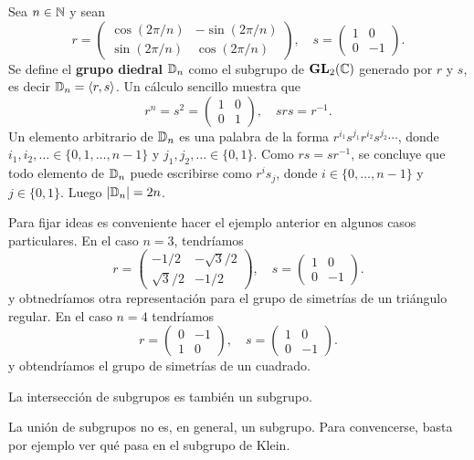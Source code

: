 \begin{example}
Sea $n\in\mathbb{N}$ y sean 
\[
r=\begin{pmatrix}	
\cos(2\pi/n) & -\sin(2\pi/n)\\
\sin(2\pi/n) & \cos(2\pi/n)
\end{pmatrix},
\quad
s=\begin{pmatrix}
	1 & 0\\
	0 & -1
\end{pmatrix}.
\]
Se define el \textbf{grupo diedral} $\mathbb{D}_n$ como
el subgrupo de $\mathbf{GL}_2(\mathbb{C})$ generado por $r$ y $s$, 
es decir $\mathbb{D}_n=\langle r,s\rangle$. Un cálculo sencillo muestra que
\[
r^n=s^2=\begin{pmatrix}
	1&0\\
	0&1
\end{pmatrix},
\quad
srs=r^{-1}.
\] 
Un elemento arbitrario de $\mathbb{D}_n$ es una palabra  
de la forma $r^{i_1}s^{j_1}r^{i_2}s^{j_2}\cdots$, donde $i_1,i_2,\dots\in\{0,1,\dots,n-1\}$ y 
$j_1,j_2,\dots\in\{0,1\}$. Como $rs=sr^{-1}$, se concluye que 
todo elemento de $\mathbb{D}_n$ puede escribirse como $r^is_j$, 
donde $i\in\{0,\dots,n-1\}$ y $j\in\{0,1\}$. Luego  
$|\mathbb{D}_n|=2n$. 
\end{example}

Para fijar ideas es conveniente hacer el ejemplo anterior en algunos casos particulares. 
En el caso $n=3$, tendríamos
\[
r=\begin{pmatrix}	
-1/2 & -\sqrt{3}/2\\
\sqrt{3}/2 & -1/2
\end{pmatrix},
\quad
s=\begin{pmatrix}
	1 & 0\\
	0 & -1
\end{pmatrix}.
\]
y obtnedríamos otra representación para el grupo de simetrías de un triángulo regular. En el caso
$n=4$ tendríamos
\[
r=\begin{pmatrix}	
0 & -1\\
1 & 0
\end{pmatrix},
\quad
s=\begin{pmatrix}
	1 & 0\\
	0 & -1
\end{pmatrix}.
\]
y obtendríamos el grupo de simetrías de un cuadrado. 

\begin{exercise}
	La intersección de subgrupos es también un subgrupo.
\end{exercise}

La unión de subgrupos no es, en general, un subgrupo. Para convencerse, basta por ejemplo ver qué pasa 
en el subgrupo de Klein. 

